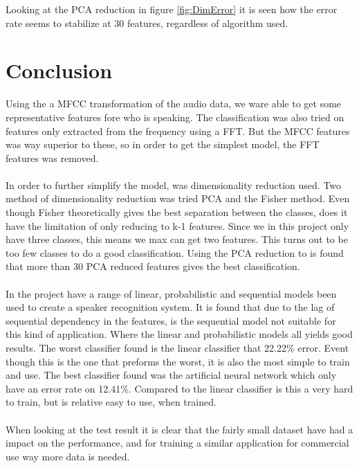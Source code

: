 Looking at the PCA reduction in figure \ref{fig:DimError} it is seen how the error rate seems to stabilize at 30 features, regardless of algorithm used.


\section{Conclusion}
Using the a MFCC transformation of the audio data, we ware able to get some representative features fore who is speaking. The classification was also tried on features only extracted from the frequency using a FFT. But the MFCC features was way superior to these, so in order to get the simplest model, the FFT features was removed. \\\ \\

In order to further simplify the model, was dimensionality reduction used. Two method of dimensionality reduction was tried PCA and the Fisher method. Even though Fisher theoretically gives the best separation between the classes, does it have the limitation of only reducing to k-1 features. Since we in this project only have three classes, this means we max can get two features. This turns out to be too few classes to do a good classification. Using the PCA reduction to is found that more than 30 PCA reduced features gives the best classification.  \\\ \\ 

In the project have a range of linear, probabilistic and sequential models been used to create a speaker recognition system. It is found that due to the lag of sequential dependency in the features, is the sequential model not suitable for this kind of application. Where the linear and probabilistic models all yields good results. The worst classifier found is the linear classifier that 22.22\% error. Event though this is the one that preforms the worst, it is also the most simple to train and use. The best classifier found was the artificial neural network which only have an error rate on 12.41\%. Compared to the linear classifier is this a very hard to train, but is relative easy to use, when trained. \\\ \\  

When looking at the test result it is clear that the fairly small dataset have had a impact on the performance, and for training a similar application for commercial use way more data is needed. 
